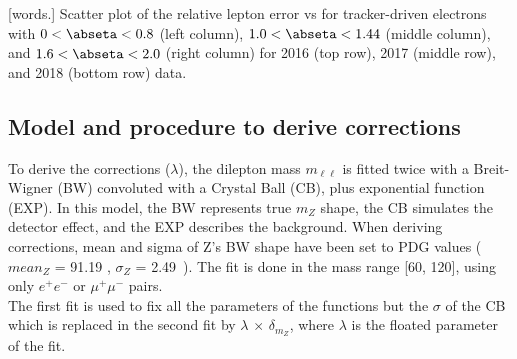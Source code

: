 \begin{multiFigure}
    \centering


        [words.]
        {Scatter plot of the relative lepton \PT error vs \PT for tracker-driven electrons with $0 < \abseta < 0.8$ (left column), $1.0 < \abseta < 1.44$ (middle column), and $1.6 < \abseta < 2.0$ (right column) for 2016 (top row), 2017 (middle row), and 2018 (bottom row) data.}
    \label{fig:2D_Mpas_vs_pt_electron_tracker}
\end{multiFigure}

\subsection{Model and procedure to derive corrections}
To derive the corrections ($\lambda$), the dilepton mass $m_{\ell\ell}$ is fitted twice with a 
Breit-Wigner (BW) convoluted with a Crystal Ball (CB), plus exponential function (EXP). In this model, 
the BW represents true $m_{Z}$ shape, the CB simulates the detector effect, and the EXP 
describes the background. When deriving corrections, mean and sigma of Z's BW shape have been set to PDG
values ($mean_{Z}$ = 91.19 \GeV,  $\sigma_{Z}$ = 2.49\GeV~\cite{particle_data_group_review_2020}).
 The fit is done in the mass range [60, 120]\GeV, using only
$e^{+}e^{-}$ or $\mu^{+}\mu^{-}$ pairs.\\
The first fit is used to fix all the parameters of the functions but the $\sigma$ of the CB which is
replaced in the second fit by $\lambda$ $\times$ $\delta_{m_{Z}}$, where $\lambda$ is the 
floated parameter of the fit. 


